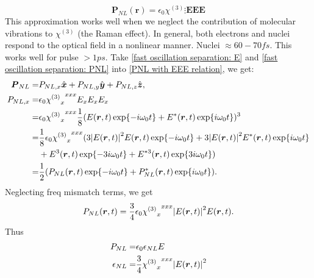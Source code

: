 \documentclass[12pt]{extarticle}
\numberwithin{equation}{section}
\numberwithin{figure}{section}
\numberwithin{table}{section}
\newcommand{\<}{\langle}
\renewcommand{\>}{\rangle}
\theoremstyle{definition}
\begin{document}
\begin{itemize}
\begin{equation}
                    \boldsymbol{P}_{NL}(\boldsymbol{r}) = \epsilon_0 \chi^{(3)} \vdots \boldsymbol{EEE}
                \end{equation}
                This approximation works well when we neglect the contribution of molecular vibrations to $\chi^{(3)}$ (the Raman effect). In general, both electrons and nuclei respond to the optical field in a nonlinear manner. Nuclei $\approx 60-70fs$. This works well for pulse $>1ps$. Take \autoref{fast oscillation separation: E} and \autoref{fast oscillation separation: PNL} into \autoref{PNL with EEE relation}, we get:
                \begin{equation}
                \begin{split}
                    \boldsymbol{P}_{NL}=& P_{NL,x}\hat{\boldsymbol{x}}+P_{NL,y}\hat{\boldsymbol{y}}+P_{NL,z}\hat{\boldsymbol{z}},\\
                    P_{NL,x}=&\epsilon_0 {{\chi^{(3)}}_x}^{xxx} E_x E_x E_x\\
                    =&\epsilon_0 {{\chi^{(3)}}_x}^{xxx} \frac{1}{8}(E(\boldsymbol{r},t)\exp{-i\omega_0 t}+E^{*}(\boldsymbol{r},t)\exp{i\omega_0 t})^3\\
                    =&\frac{1}{8} \epsilon_0 {{\chi^{(3)}}_x}^{xxx}(3\abs{E(\boldsymbol{r},t)}^2 E(\boldsymbol{r},t)\exp{-i\omega_0 t}+3\abs{E(\boldsymbol{r},t)}^2 E^{*}(\boldsymbol{r},t)\exp{i\omega_0 t}\\
                    &+E^3(\boldsymbol{r},t)\exp{-3i\omega_0 t}+E^{*3}(\boldsymbol{r},t)\exp{3i\omega_0 t})\\
                    =&\frac{1}{2}(P_{NL}(\boldsymbol{r},t)\exp{-i\omega_0 t}+P_{NL}^{*}(\boldsymbol{r},t)\exp{i\omega_0 t}).
                    \label{derivation of epsilion NL = 3/4 chi3 E2}
                \end{split}
                \end{equation}
                Neglecting freq mismatch terms, we get
                \begin{equation}
                    P_{NL}(\boldsymbol{r},t) = \frac{3}{4}\epsilon_0{{\chi^{(3)}}_x}^{xxx}\abs{E(\boldsymbol{r},t)}^2E(\boldsymbol{r},t).
                \end{equation}
                Thus
                \begin{subequations}
                \begin{align}
                    P_{NL}=&\epsilon_0\epsilon_{NL}E\\
                    \epsilon_{NL}=&\frac{3}{4}{{\chi^{(3)}}_x}^{xxx}\abs{E(\boldsymbol{r},t)}^2\label{Nonlinear epsilon relation with chi3 and E}

\end{align}
\end{subequations}
\end{itemize}
\end{document}
